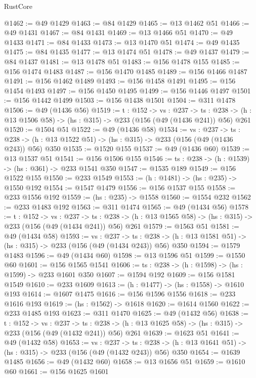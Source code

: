 \begin{lexlean}{RustCore}
\begin{coremodule}
@1462 := @49 @1429
@1463 := @84 @1429
@1465 := @13 @1462 @51
@1466 := @49 @1431
@1467 := @84 @1431
@1469 := @13 @1466 @51
@1470 := @49 @1433
@1471 := @84 @1433
@1473 := @13 @1470 @51
@1474 := @49 @1435
@1475 := @84 @1435
@1477 := @13 @1474 @51
@1478 := @49 @1437
@1479 := @84 @1437
@1481 := @13 @1478 @51
@1483 := @156 @1478 @155
@1485 := @156 @1474 @1483
@1487 := @156 @1470 @1485
@1489 := @156 @1466 @1487
@1491 := @156 @1462 @1489
@1493 := @156 @1458 @1491
@1495 := @156 @1454 @1493
@1497 := @156 @1450 @1495
@1499 := @156 @1446 @1497
@1501 := @156 @1442 @1499
@1503 := @156 @1438 @1501
@1504 := @311 @1478
@1506 := @49 (@1436 @56)
@1519 := {t : @152} ->
  {vs : @237} ->
  {ts : @238} -> (h : @13 @1506 @58) -> (hs : @315) -> @233 (@156 (@49 (@1436 @241)) @56) @261
@1520 := @1504 @51
@1522 := @49 (@1436 @58)
@1534 := {vs : @237} ->
  {ts : @238} -> (h : @13 @1522 @51) -> (hs : @315) -> @233 (@156 (@49 (@1436 @243)) @56) @350
@1535 := @1520 @155
@1537 := @49 (@1436 @60)
@1539 := @13 @1537 @51
@1541 := @156 @1506 @155
@1546 := {ts : @238} -> (h : @1539) -> (hs : @361) -> @233 @1541 @350
@1547 := @1535 @189
@1549 := @156 @1522 @155
@1550 := @233 @1549
@1553 := (h : @1481) -> (hs : @235) -> @1550 @192
@1554 := @1547 @1479
@1556 := @156 @1537 @155
@1558 := @233 @1556 @192
@1559 := (hs : @235) -> @1558
@1560 := @1554 @232
@1562 := @233 @1483 @192
@1563 := @311 @1474
@1565 := @49 (@1434 @56)
@1578 := {t : @152} ->
  {vs : @237} ->
  {ts : @238} -> (h : @13 @1565 @58) -> (hs : @315) -> @233 (@156 (@49 (@1434 @241)) @56) @261
@1579 := @1563 @51
@1581 := @49 (@1434 @58)
@1593 := {vs : @237} ->
  {ts : @238} -> (h : @13 @1581 @51) -> (hs : @315) -> @233 (@156 (@49 (@1434 @243)) @56) @350
@1594 := @1579 @1483
@1596 := @49 (@1434 @60)
@1598 := @13 @1596 @51
@1599 := @1550 @60
@1601 := @156 @1565 @1541
@1606 := {ts : @238} -> (h : @1598) -> (hs : @1599) -> @233 @1601 @350
@1607 := @1594 @192
@1609 := @156 @1581 @1549
@1610 := @233 @1609
@1613 := (h : @1477) -> (hs : @1558) -> @1610 @193
@1614 := @1607 @1475
@1616 := @156 @1596 @1556
@1618 := @233 @1616 @193
@1619 := (hs : @1562) -> @1618
@1620 := @1614 @1560
@1622 := @233 @1485 @193
@1623 := @311 @1470
@1625 := @49 (@1432 @56)
@1638 := {t : @152} ->
  {vs : @237} ->
  {ts : @238} -> (h : @13 @1625 @58) -> (hs : @315) -> @233 (@156 (@49 (@1432 @241)) @56) @261
@1639 := @1623 @51
@1641 := @49 (@1432 @58)
@1653 := {vs : @237} ->
  {ts : @238} -> (h : @13 @1641 @51) -> (hs : @315) -> @233 (@156 (@49 (@1432 @243)) @56) @350
@1654 := @1639 @1485
@1656 := @49 (@1432 @60)
@1658 := @13 @1656 @51
@1659 := @1610 @60
@1661 := @156 @1625 @1601

\end{coremodule}
\end{lexlean}
